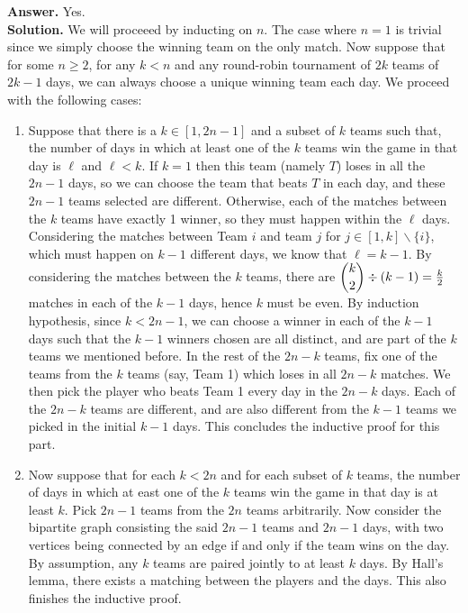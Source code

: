 \documentclass[11pt,a4paper]{article}
\newcommand{\<}{\langle}
\renewcommand{\>}{\rangle}
\begin{document}
\begin{enumerate}
	\textbf{Answer.} Yes. \\
	\textbf{Solution.} We will proceeed by inducting on $n$. The case where $n=1$ is trivial since we simply choose the winning team on the only match. Now suppose that for some $n\ge 2$, for any $k<n$ and any round-robin tournament of $2k$ teams of $2k-1$ days, we can always choose a unique winning team each day. We proceed with the following cases: 
	\begin{enumerate}
		\item Suppose that there is a $k\in [1, 2n-1]$ and a subset of $k$ teams such that, the number of days in which at least one of the $k$ teams win the game in that day is $\ell$ and $\ell < k$. If $k=1$ then this team (namely $T$) loses in all the $2n-1$ days, so we can choose the team that beats $T$ in each day, and these $2n-1$ teams selected are different. Otherwise, each of the matches between the $k$ teams have exactly 1 winner, so they must happen within the $\ell$ days. Considering the matches between Team $i$ and team $j$ for $j\in [1, k]\backslash \{i\}$, which must happen on $k-1$ different days, we know that $\ell = k-1$. By considering the matches between the $k$ teams, there are $\dbinom{k}{2}\div (k-1)=\frac{k}{2}$ matches in each of the $k-1$ days, hence $k$ must be even. By induction hypothesis, since $k<2n-1$, we can choose a winner in each of the $k-1$ days such that the $k-1$ winners chosen are all distinct, and are part of the $k$ teams we mentioned before. In the rest of the $2n-k$ teams, fix one of the teams from the $k$ teams (say, Team 1) which loses in all $2n-k$ matches. We then pick the player who beats Team 1 every day in the $2n-k$ days. Each of the $2n-k$ teams are different, and are also different from the $k-1$ teams we picked in the initial $k-1$ days. This concludes the inductive proof for this part. 
		
		\item Now suppose that for each $k<2n$ and for each subset of $k$ teams, the number of days in which at east one of the $k$ teams win the game in that day is at least $k$. Pick $2n-1$ teams from the $2n$ teams arbitrarily. Now consider the bipartite graph consisting the said $2n-1$ teams and $2n-1$ days, with two vertices being connected by an edge if and only if the team wins on the day. By assumption, any $k$ teams are paired jointly to at least $k$ days. By Hall's lemma, there exists a matching between the players and the days. This also finishes the inductive proof. 
	\end{enumerate}
	

\end{enumerate}
\end{document}
